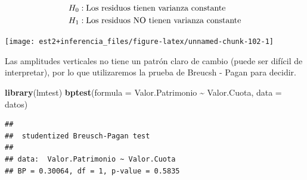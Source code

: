 \documentclass[
  11pt,
]{book}
\newenvironment{Shaded}{\begin{snugshade}}{\end{snugshade}}
\newcommand{\AttributeTok}[1]{\textcolor[rgb]{0.13,0.29,0.53}{#1}}
\newcommand{\DecValTok}[1]{\textcolor[rgb]{0.00,0.00,0.81}{#1}}
\newcommand{\FunctionTok}[1]{\textcolor[rgb]{0.13,0.29,0.53}{\textbf{#1}}}
\newcommand{\NormalTok}[1]{#1}
\newcommand{\OtherTok}[1]{\textcolor[rgb]{0.56,0.35,0.01}{#1}}
\newcommand{\SpecialCharTok}[1]{\textcolor[rgb]{0.81,0.36,0.00}{\textbf{#1}}}
\newcommand{\StringTok}[1]{\textcolor[rgb]{0.31,0.60,0.02}{#1}}
\theoremstyle{definition}
\theoremstyle{definition}
\theoremstyle{definition}
\theoremstyle{definition}
\theoremstyle{remark}
\begin{document}
\begin{equation}
\notag
\begin{split}
H_0&: \text{Los residuos tienen varianza constante}\\
H_1&: \text{Los residuos NO tienen varianza constante}\\
\end{split}
\end{equation}

\begin{Shaded}
\end{Shaded}

\begin{center}\texttt{[image: est2+inferencia\_files/figure-latex/unnamed-chunk-102-1]} \end{center}

Las amplitudes verticales no tiene un patrón claro de cambio (puede ser difícil de interpretar), por lo que utilizaremos la prueba de Breucsh - Pagan para decidir.

\begin{Shaded}
\begin{Highlighting}[]
\FunctionTok{library}\NormalTok{(lmtest)}
\FunctionTok{bptest}\NormalTok{(}\AttributeTok{formula =}\NormalTok{ Valor.Patrimonio }\SpecialCharTok{\textasciitilde{}}\NormalTok{ Valor.Cuota,}
       \AttributeTok{data =}\NormalTok{ datos)}
\end{Highlighting}
\end{Shaded}

\begin{verbatim}
## 
##  studentized Breusch-Pagan test
## 
## data:  Valor.Patrimonio ~ Valor.Cuota
## BP = 0.30064, df = 1, p-value = 0.5835
\end{verbatim}
\end{document}
